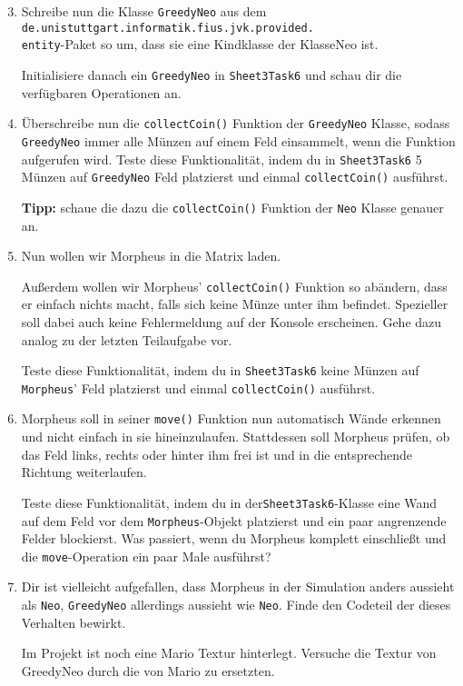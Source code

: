\begin{enumerate}\setcounter{enumi}{2}
\item Schreibe nun die Klasse \lstinline{GreedyNeo} aus dem \texttt{de.unistuttgart.informatik.fius.jvk.provided.}\\\texttt{entity}-Paket so um, dass sie eine Kindklasse der KlasseNeo ist.

Initialisiere danach ein \lstinline{GreedyNeo} in \lstinline{Sheet3Task6} und schau dir die verfügbaren Operationen an.

\item Überschreibe nun die \lstinline{collectCoin()} Funktion der \lstinline{GreedyNeo} Klasse, sodass \lstinline{GreedyNeo} immer alle Münzen auf einem Feld einsammelt, wenn die Funktion aufgerufen wird.
Teste diese Funktionalität, indem du in \lstinline{Sheet3Task6} 5 Münzen auf \lstinline{GreedyNeo} Feld platzierst und einmal \lstinline{collectCoin()} ausführst.

\textbf{Tipp:} schaue die dazu die \lstinline{collectCoin()} Funktion der \lstinline{Neo} Klasse genauer an.

\item Nun wollen wir Morpheus in die Matrix laden.

Außerdem wollen wir Morpheus' \lstinline{collectCoin()} Funktion so abändern, dass er einfach nichts macht, falls sich keine Münze unter ihm befindet.
Spezieller soll dabei auch keine Fehlermeldung auf der Konsole erscheinen.
Gehe dazu analog zu der letzten Teilaufgabe vor.

Teste diese Funktionalität, indem du in \lstinline{Sheet3Task6} keine Münzen auf \lstinline{Morpheus}' Feld platzierst und einmal \lstinline{collectCoin()} ausführst.

\item Morpheus soll in seiner \lstinline{move()} Funktion nun automatisch Wände erkennen und nicht einfach in sie hineinzulaufen.
Stattdessen soll Morpheus prüfen, ob das Feld links, rechts oder hinter ihm frei ist und in die entsprechende Richtung weiterlaufen.

Teste diese Funktionalität, indem du in der\lstinline{Sheet3Task6}-Klasse eine Wand auf dem Feld vor dem \lstinline{Morpheus}-Objekt platzierst und ein paar angrenzende Felder blockierst.
Was passiert, wenn du Morpheus komplett einschließt und die \lstinline{move}-Operation ein paar Male ausführst?

\item \optional Dir ist vielleicht aufgefallen, dass Morpheus in der Simulation anders aussieht als \lstinline{Neo}, \lstinline{GreedyNeo} allerdings aussieht wie \lstinline{Neo}.
Finde den Codeteil der dieses Verhalten bewirkt.

Im Projekt ist noch eine Mario Textur hinterlegt.
Versuche die Textur von GreedyNeo durch die von Mario zu ersetzten.

\end{enumerate}
